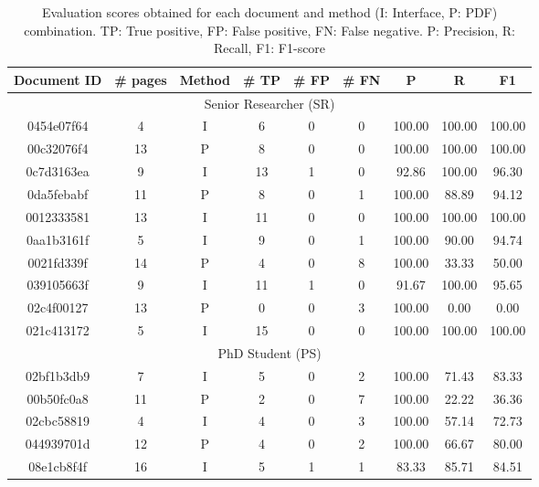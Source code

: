 \begin{table}[ht]
\centering
\small
\caption{Evaluation scores obtained for each document and method (I: Interface, P: PDF) combination. TP: True positive, FP: False positive, FN: False negative. P: Precision, R: Recall, F1: F1-score }
\label{tab:curation-evaluation-detailed-results}
\begin{tabular}{cc|c|ccc|ccc}
\textbf{Document ID} & \# \textbf{pages} & \textbf{Method} & \# \textbf{TP}	& \# \textbf{FP}	& \# \textbf{FN}	& \textbf{P}	& \textbf{R}	& \textbf{F1} \\
\toprule
\multicolumn{9}{c}{Senior Researcher (SR)}\\
\midrule
0454e07f64  & 4     & I     & 6     & 0     &   0   & 100.00    & 100.00    & 100.00 \\
00c32076f4  & 13    & P     & 8     & 0     &   0   & 100.00    & 100.00    & 100.00 \\
0c7d3163ea  & 9     & I     & 13    & 1     &   0   & 92.86     & 100.00    & 96.30 \\
0da5febabf  & 11    & P     & 8     & 0     &   1   & 100.00    & 88.89     & 94.12 \\
0012333581  & 13    & I     & 11    & 0     &   0   & 100.00    & 100.00    & 100.00 \\
0aa1b3161f  & 5     & I     & 9     & 0     &   1   & 100.00    & 90.00     & 94.74 \\
0021fd339f  & 14    & P     & 4     & 0     &   8   & 100.00    & 33.33     & 50.00 \\
039105663f  & 9     & I     & 11    & 1     &   0   & 91.67     & 100.00    & 95.65 \\
02c4f00127  & 13    & P     & 0     & 0     &   3   & 100.00    & 0.00      & 0.00 \\
021c413172  & 5     & I     & 15    & 0     &   0   & 100.00    & 100.00    & 100.00 \\
\midrule
\multicolumn{9}{c}{PhD Student (PS)}\\
\midrule
02bf1b3db9  & 7     & I     & 5     & 0     &   2   & 100.00    & 71.43     & 83.33 \\
00b50fc0a8  & 11    & P     & 2     & 0     &   7   & 100.00    & 22.22     & 36.36 \\
02cbc58819  & 4     & I     & 4     & 0     &   3   & 100.00    & 57.14     & 72.73 \\
044939701d  & 12    & P     & 4     & 0     &   2   & 100.00    & 66.67     & 80.00 \\
08e1cb8f4f  & 16    & I     & 5     & 1     &   1   & 83.33     & 85.71     & 84.51 \\

\end{tabular}
\end{table}
